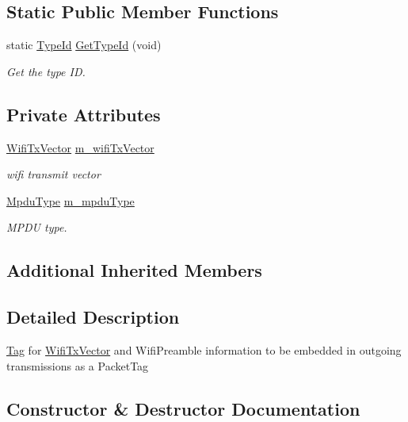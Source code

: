 \subsection*{Static Public Member Functions}
\begin{DoxyCompactItemize}
\item 
static \hyperlink{classns3_1_1TypeId}{Type\+Id} \hyperlink{classns3_1_1WifiPhyTag_aab7a09c8f268240375ff9789cf806d17}{Get\+Type\+Id} (void)
\begin{DoxyCompactList}\small\item\em Get the type ID. \end{DoxyCompactList}\end{DoxyCompactItemize}
\subsection*{Private Attributes}
\begin{DoxyCompactItemize}
\item 
\hyperlink{classns3_1_1WifiTxVector}{Wifi\+Tx\+Vector} \hyperlink{classns3_1_1WifiPhyTag_abc94baf66b26c043e6a941c9f690b2a9}{m\+\_\+wifi\+Tx\+Vector}
\begin{DoxyCompactList}\small\item\em wifi transmit vector \end{DoxyCompactList}\item 
\hyperlink{namespacens3_ae617d41bbd0c07fa58ee2306f687b055}{Mpdu\+Type} \hyperlink{classns3_1_1WifiPhyTag_ae25916f5726cb17f21de9f16f0684e9f}{m\+\_\+mpdu\+Type}
\begin{DoxyCompactList}\small\item\em M\+P\+DU type. \end{DoxyCompactList}\end{DoxyCompactItemize}
\subsection*{Additional Inherited Members}


\subsection{Detailed Description}
\hyperlink{classns3_1_1Tag}{Tag} for \hyperlink{classns3_1_1WifiTxVector}{Wifi\+Tx\+Vector} and Wifi\+Preamble information to be embedded in outgoing transmissions as a Packet\+Tag 

\subsection{Constructor \& Destructor Documentation}
